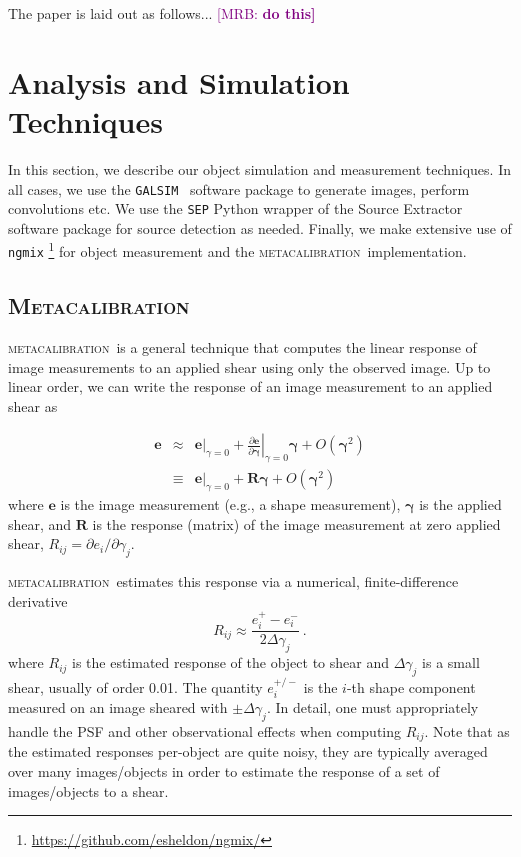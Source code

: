 \documentclass[fleqn,useAMS,usenatbib]{mnras}
\newcommand{\mrb}[1]{\textcolor{purple}{[MRB: \bf #1]}}
\newcommand{\galsim}{\texttt{GALSIM}}
\newcommand{\ngmix}{\texttt{ngmix}}
\newcommand{\mcal}{\textsc{metacalibration}}
\begin{document}
The paper is laid out as follows... \mrb{do this}

\section{Analysis and Simulation Techniques}
\label{sec:sims}

In this section, we describe our object simulation and measurement techniques.
In all cases, we use the \galsim\ \citep{GALSIM2015} software package to
generate images, perform convolutions etc. We use the \texttt{SEP} \citep{sep}
Python wrapper of the Source Extractor software package \citep{Bertin96} for
source detection as needed. Finally, we make extensive use of \ngmix
\footnote{\url{https://github.com/esheldon/ngmix/}} for object measurement and
the \mcal\ implementation.

\subsection{\textsc{Metacalibration}}

\mcal\ is a general technique that computes the linear response of image
measurements to an applied shear using only the observed image. Up to linear
order, we can write the response of an image measurement to an applied shear as

\begin{eqnarray}
\boldsymbol{e} & \approx & \left.\boldsymbol{e}\right|_{\gamma=0} +
                           \left.\frac{\partial \boldsymbol{e}}{\partial\boldsymbol\gamma}\right|_{\gamma=0} \boldsymbol\gamma +
                           O(\boldsymbol\gamma^2)\nonumber\\
               & \equiv  & \left.\boldsymbol{e}\right|_{\gamma=0} +
                           \boldsymbol{R} \boldsymbol\gamma +
                           O(\boldsymbol\gamma^2)
\end{eqnarray}
where $\boldsymbol{e}$ is the image measurement (e.g., a shape
measurement), $\boldsymbol\gamma$ is the applied shear, and $\boldsymbol{R}$ is
the response (matrix) of the image measurement at zero applied shear,
$R_{ij}=\partial e_i /\partial \gamma_j$.

\mcal\ estimates this response via a numerical, finite-difference derivative
\begin{displaymath}
R_{ij} \approx \frac{e_i^{+} - e_i^{-}}{2\Delta\gamma_j}\ .
\end{displaymath}
where $R_{ij}$ is the estimated response of the object to shear
and $\Delta\gamma_j$ is a small shear, usually of order 0.01. The quantity
$e_i^{+/-}$ is the $i$-th shape component measured on an image sheared with
$\pm\Delta\gamma_j$. In detail, one must appropriately handle the PSF and
other observational effects when computing $R_{ij}$. Note that as the
estimated responses per-object are quite noisy, they are typically averaged
over many images/objects in order to estimate the response of a set of
images/objects to a shear.
\end{document}
